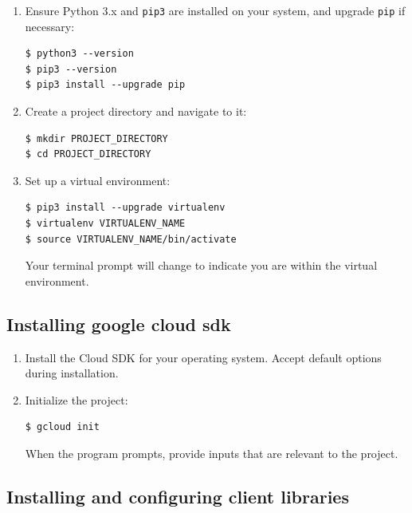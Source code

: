 \documentclass{article}
\begin{document}
\begin{enumerate}
    \item Ensure Python 3.x and \texttt{pip3} are installed on your system, and upgrade \texttt{pip} if necessary:

\begin{lstlisting}[style=bash]
$ python3 --version
$ pip3 --version
$ pip3 install --upgrade pip
\end{lstlisting}

    \item Create a project directory and navigate to it:

\begin{lstlisting}[style=bash]
$ mkdir PROJECT_DIRECTORY
$ cd PROJECT_DIRECTORY
\end{lstlisting}

    \item Set up a virtual environment:

\begin{lstlisting}[style=bash]
$ pip3 install --upgrade virtualenv
$ virtualenv VIRTUALENV_NAME
$ source VIRTUALENV_NAME/bin/activate
\end{lstlisting}

    Your terminal prompt will change to indicate you are within the virtual environment.
\end{enumerate}

\subsection*{Installing google cloud sdk}

\begin{enumerate}
    \item Install the Cloud SDK for your operating system. Accept default options during installation.
    
    \item Initialize the project:

\begin{lstlisting}[style=bash]
$ gcloud init
\end{lstlisting}

    When the program prompts, provide inputs that are relevant to the project.
\end{enumerate}

\subsection*{Installing and configuring client libraries}
\end{document}
